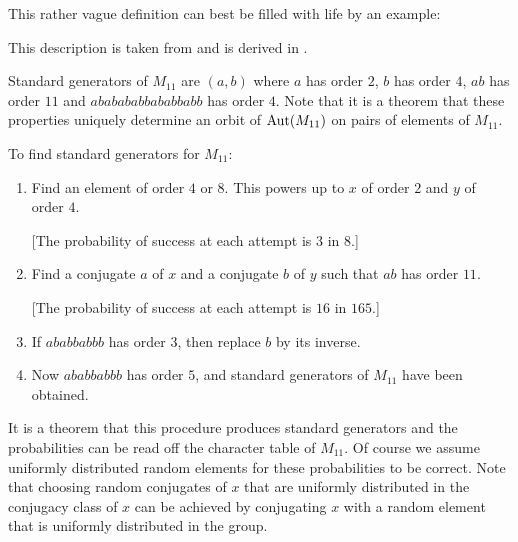 This rather vague definition can best be filled with life by an
example:

\begin{Exa}
    \label{ExaM11}
    This description is taken from \cite[$M_{11}$ page]{WWWAtlas} and
%
    is derived in \cite[Example~11]{standgens}.

    Standard generators of $M_{11}$ are $(a,b)$ where $a$ has order $2$, 
$b$ has order $4$, $ab$ has order $11$ and $ababababbababbabb$ has 
order $4$. Note that it is a theorem that these properties uniquely
determine an orbit of $\Aut(M_{11})$ on pairs of elements of $M_{11}$.

\smallskip
To find standard generators for $M_{11}$:
\begin{enumerate}
        \setlength{\parskip}{0pt}
    \item Find an element of order $4$ or $8$. This powers up to $x$ of order 
        $2$ and $y$ of order $4$.

      [The probability of success at each attempt is $3$ in $8$.]
\item Find a conjugate $a$ of $x$ and a conjugate $b$ of $y$ such that $ab$ 
    has order $11$.

      [The probability of success at each attempt is $16$ in $165$.]
  \item If $ababbabbb$ has order $3$, then replace $b$ by its inverse.
  \item Now $ababbabbb$ has order $5$, and standard generators of $M_{11}$ 
      have been obtained.
\end{enumerate}
It is a theorem that this procedure produces standard generators and the
probabilities can be read off the character table of $M_{11}$. Of course 
we assume uniformly distributed random elements for these
probabilities to be correct.
Note that choosing random conjugates of $x$ that are uniformly distributed in the
conjugacy class of $x$ can be achieved by conjugating $x$ with a random element
that is uniformly distributed in the group.
\end{Exa}


